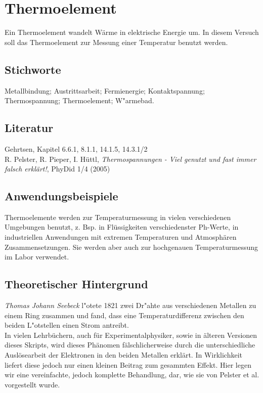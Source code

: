 \chapter{Thermoelement}
\label{v:11}

Ein Thermoelement wandelt Wärme in elektrische Energie um. In diesem Versuch soll das Thermoelement zur Messung einer Temperatur benutzt werden.

\section{Stichworte}

Metallbindung; Austrittsarbeit; Fermienergie; Kontaktspannung; Thermospannung; Thermoelement; W"armebad.
%
\section{Literatur}

Gehrtsen, Kapitel 6.6.1, 8.1.1, 14.1.5, 14.3.1/2\\
R. Pelster, R. Pieper, I. Hüttl, \textit{Thermospannungen - Viel genutzt und fast immer falsch erklärt!}, PhyDid 1/4 (2005)

\section{Anwendungsbeispiele}

Thermoelemente werden zur Temperaturmessung in vielen verschiedenen Umgebungen benutzt, z. Bsp. in Flüssigkeiten verschiedenster Ph-Werte, in industriellen Anwendungen mit extremen Temperaturen und Atmosphären Zusammensetzungen. Sie werden aber auch zur hochgenauen Temperaturmessung im Labor verwendet.

\section{Theoretischer Hintergrund}

\textit{Thomas Johann Seebeck} l"otete 1821 zwei Dr"ahte aus verschiedenen Metallen zu einem Ring zusammen und fand, dass eine Temperaturdifferenz zwischen den beiden L"otstellen einen Strom antreibt.\\
In vielen Lehrbüchern, auch für Experimentalphysiker, sowie in älteren Versionen dieses Skripts, wird dieses Phänomen fälschlicherweise durch die unterschiedliche Auslösearbeit der Elektronen in den beiden Metallen erklärt. In Wirklichkeit liefert diese jedoch nur einen kleinen Beitrag zum gesammten Effekt. Hier legen wir eine vereinfachte, jedoch komplette Behandlung, dar, wie sie von Pelster et al. vorgestellt wurde.

